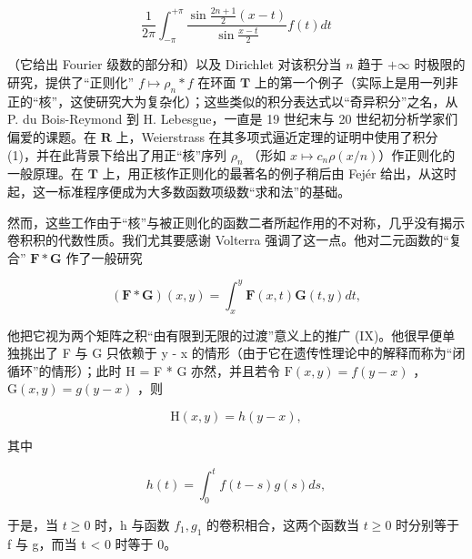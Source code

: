\[
\frac {1}{2 \pi} \int_ {- \pi} ^ {+ \pi} \frac {\sin \frac {2 n + 1}{2} (x - t)}{\sin \frac {x - t}{2}} f (t) d t\tag{2}
\]

（它给出 Fourier 级数的部分和）以及 Dirichlet 对该积分当 \(n\) 趋于 \(+\infty\) 时极限的研究，提供了“正则化” \(f \mapsto \rho_n * f\) 在环面 \(\mathbf{T}\) 上的第一个例子（实际上是用一列非正的“核”，这使研究大为复杂化）；这些类似的积分表达式以“奇异积分”之名，从 P. du Bois-Reymond 到 H. Lebesgue，一直是 19 世纪末与 20 世纪初分析学家们偏爱的课题。在 \(\mathbf{R}\) 上，Weierstrass 在其多项式逼近定理的证明中使用了积分 (1)，并在此背景下给出了用正“核”序列 \(\rho_n\) （形如 \(x \mapsto c_n \rho(x/n)\)）作正则化的一般原理。在 \(\mathbf{T}\) 上，用正核作正则化的最著名的例子稍后由 Fejér 给出，从这时起，这一标准程序便成为大多数函数项级数“求和法”的基础。

然而，这些工作由于“核”与被正则化的函数二者所起作用的不对称，几乎没有揭示卷积积的代数性质。我们尤其要感谢 Volterra 强调了这一点。他对二元函数的“复合” \(\mathbf{F}*\mathbf{G}\) 作了一般研究

\[
(\mathbf {F} * \mathbf {G}) (x, y) = \int_ {x} ^ {y} \mathbf {F} (x, t) \mathbf {G} (t, y) d t,
\]

他把它视为两个矩阵之积“由有限到无限的过渡”意义上的推广 (IX)。他很早便单独挑出了 F 与 G 只依赖于 y - x 的情形（由于它在遗传性理论中的解释而称为“闭循环”的情形）；此时 H = F * G 亦然，并且若令 \(\mathrm{F}(x,y)=f(y-x)\) ，\(\mathrm{G}(x,y)=g(y-x)\) ，则

\[
\mathrm{H} (x, y) = h (y - x),
\]

其中

\[
h (t) = \int_ {0} ^ {t} f (t - s) g (s) d s,
\]

于是，当 \(t \geqslant 0\) 时，h 与函数 \(f_{1}, g_{1}\) 的卷积相合，这两个函数当 \(t \geqslant 0\) 时分别等于 f 与 g，而当 t \textless{} 0 时等于 0。

